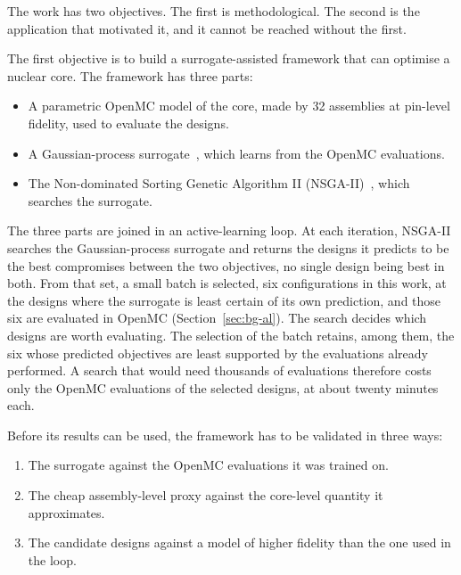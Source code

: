 The work has two objectives. The first is methodological. The second
is the application that motivated it, and it cannot be reached without
the first.

The first objective is to build a surrogate-assisted framework that can
optimise a nuclear core. The framework has three parts:

\begin{itemize}
  \item A parametric OpenMC model of the core, made by 32 assemblies at 
        pin-level fidelity, used to evaluate the designs.

  \item A Gaussian-process surrogate~\cite{rasmussen_gp_2006}, which
        learns from the OpenMC evaluations.

  \item The Non-dominated Sorting Genetic Algorithm II
        (NSGA-II)~\cite{deb_nsga2_2002}, which searches the surrogate.
\end{itemize}

The three parts are joined in an active-learning loop. At each
iteration, NSGA-II searches the Gaussian-process surrogate and returns
the designs it predicts to be the best compromises between the two
objectives, no single design being best in both. From that set,
a small batch is selected, six configurations in this work, at the
designs where the surrogate is least certain of its own prediction,
and those six are evaluated in OpenMC (Section~\ref{sec:bg-al}). The
search decides which designs are worth evaluating. The selection of
the batch retains, among them, the six whose predicted objectives are
least supported by the evaluations already performed. A search that
would need thousands of evaluations therefore costs only the OpenMC
evaluations of the selected designs, at about twenty minutes each.

Before its results can be used, the framework has to be validated in
three ways:

\begin{enumerate}
  \item The surrogate against the OpenMC evaluations it was trained on.

  \item The cheap assembly-level proxy against the core-level quantity
        it approximates.

  \item The candidate designs against a model of higher fidelity than
        the one used in the loop.
\end{enumerate}

